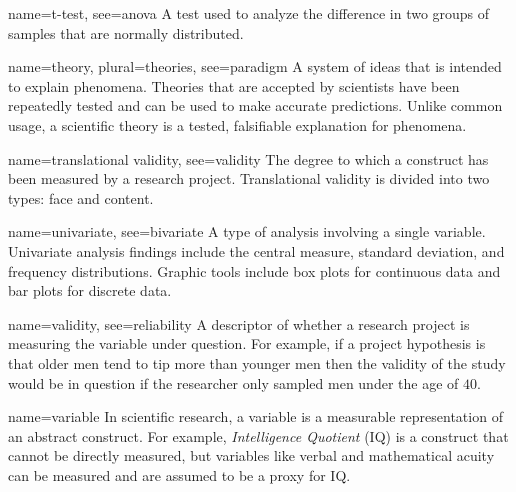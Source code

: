 {name={t-test},
	see={anova}}
{%
	A test used to analyze the difference in two groups of samples that are normally distributed.
}

{name={theory},
	plural={theories},
	see={paradigm}}
{%
	A system of ideas that is intended to explain phenomena. Theories that are accepted by scientists have been repeatedly tested and can be used to make accurate predictions. Unlike common usage, a scientific theory is a tested, falsifiable explanation for phenomena.
}

{name={translational validity},
	see={validity}}
{%
	The degree to which a construct has been measured by a research project. Translational validity is divided into two types: face and content.
}

{name={univariate},
	see={bivariate}}
{%
	A type of analysis involving a single variable. Univariate analysis findings include the central measure, standard deviation, and frequency distributions. Graphic tools include box plots for continuous data and bar plots for discrete data.
}

{name={validity},
 see={reliability}}
{%
	A descriptor of whether a research project is measuring the variable under question. For example, if a project hypothesis is that older men tend to tip more than younger men then the validity of the study would be in question if the researcher only sampled men under the age of $ 40 $.
}

{name={variable}}
{%
	In scientific research, a variable is a measurable representation of an abstract construct. For example, \textit{Intelligence Quotient} (IQ) is a construct that cannot be directly measured, but variables like verbal and mathematical acuity can be measured and are assumed to be a proxy for IQ.
}

